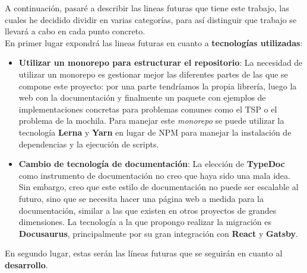 A continuación, pasaré a describir las lineas futuras que tiene este trabajo, las cuales he decidido dividir en varias categorías, para así distinguir que trabajo se llevará a cabo en cada punto concreto. \\

En primer lugar expondrá las lineas futuras en cuanto a \textbf{tecnologías utilizadas}:

\begin{itemize}
    \item \textbf{Utilizar un monorepo para estructurar el repositorio}: La necesidad de utilizar un monorepo es gestionar mejor las diferentes partes de las que se compone este proyecto: por una parte tendríamos la propia librería, luego la web con la documentación y finalmente un paquete con ejemplos de implementaciones concretas para problemas comunes como el TSP o el problema de la mochila. Para manejar este \textit{monorepo} se puede utilizar la tecnología \textbf{Lerna} y \textbf{Yarn} en lugar de NPM para manejar la instalación de dependencias y la ejecución de scripts.
    \item \textbf{Cambio de tecnología de documentación}: La elección de \textbf{TypeDoc} como instrumento de documentación no creo que haya sido una mala idea. Sin embargo, creo que este estilo de documentación no puede ser escalable al futuro, sino que se necesita hacer una página web a medida para la documentación, similar a las que existen en otros proyectos de grandes dimensiones. La tecnología a la que propongo realizar la migración es \textbf{Docusaurus}, principalmente por su gran integración con \textbf{React} y \textbf{Gatsby}.
\end{itemize}

En segundo lugar, estas serán las líneas futuras que se seguirán en cuanto al \textbf{desarrollo}.

